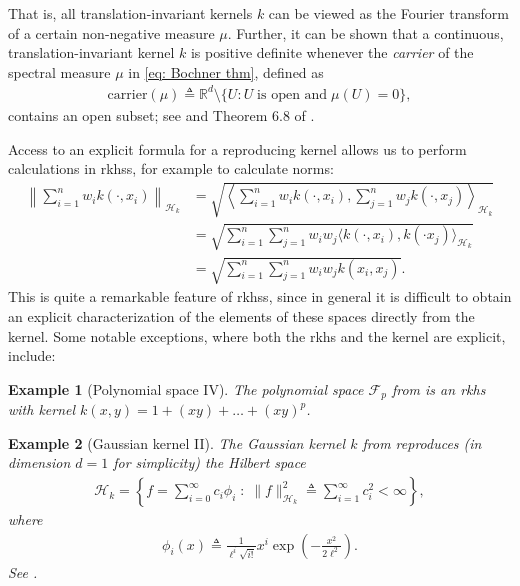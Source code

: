 \documentclass[12pt,paper=letter]{scrreprt}
\newtheorem{example}{Example}[chapter]
\def\defeq{\triangleq} %
\begin{document}
\noindent That is, all translation-invariant kernels $k$ can be viewed as the Fourier transform of a certain non-negative measure $\mu$.  
Further, it can be shown that a continuous, translation-invariant kernel $k$ is positive definite whenever the \emph{carrier} of the spectral measure $\mu$ in \eqref{eq: Bochner thm}, defined as
\begin{align*}
    \mathrm{carrier}(\mu) \defeq  \mathbb{R}^d \setminus \{ U : U \; \text{is open and} \; \mu(U) = 0 \} ,
\end{align*}
contains an open subset; see \citet{chang1996strictly} and Theorem 6.8 of \citet{wendland2004scattered}.



Access to an explicit formula for a reproducing kernel allows us to perform calculations in \acp{rkhs}, for example to calculate norms:
\begin{align*}
\left\| \sum_{i=1}^n w_i k(\cdot,x_i) \right\|_{\mathcal{H}_k} & = \sqrt{ \left\langle \sum_{i=1}^n w_i k(\cdot,x_i) , \sum_{j=1}^n w_j k(\cdot,x_j) \right\rangle_{\mathcal{H}_k} } \\
& = \sqrt{ \sum_{i=1}^n \sum_{j=1}^n w_i w_j \langle k(\cdot, x_i) , k(\cdot x_j) \rangle_{\mathcal{H}_k} } \\
& = \sqrt{ \sum_{i=1}^n \sum_{j=1}^n w_i w_j k(x_i,x_j) } .
\end{align*}
This is quite a remarkable feature of \acp{rkhs}, since in general it is difficult to obtain an explicit characterization of the elements of these spaces directly from the kernel.
Some notable exceptions, where both the \ac{rkhs} and the kernel are explicit, include:


\begin{example}[Polynomial space IV] 
\label{ex: poly space kernel}
The polynomial space $\mathcal{F}_p$ from  is an \ac{rkhs} with kernel $k(x,y) = 1 + (xy) + \dots + (xy)^p$.
\end{example}

\begin{example}[Gaussian kernel II] 
The Gaussian kernel $k$ from  reproduces (in dimension $d=1$ for simplicity) the Hilbert space
\begin{align*}
    \mathcal{H}_k = \left\{ f = \sum_{i=0}^\infty c_i \phi_i \; : \; \|f\|_{\mathcal{H}_k}^2 \defeq  \sum_{i=1}^\infty c_i^2 < \infty \right\} ,
\end{align*}
where 
\begin{align*}
    \phi_i(x) \defeq  \frac{1}{\ell^i \sqrt{i!}} x^i \exp\left( - \frac{x^2}{2\ell^2} \right) .
\end{align*}
See \citet{steinwart2006explicit}.
\end{example}
\end{document}
